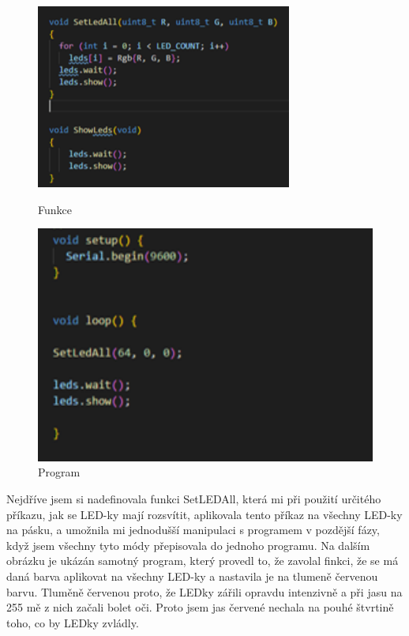     \begin{figure}[htbp]
	\centering
	\begin{minipage}[b]{0.5\textwidth}
		\centering
		\includegraphics[width=0.75\textwidth]{img/015 img/definovane-funkce.png}
		\caption{Funkce}
	\end{minipage}
	\qquad
	\begin{minipage}[b]{0.4\textwidth}
		\centering
		\includegraphics[width=1\textwidth]{img/015 img/Program1-červená.png}
		\caption{Program}
	\end{minipage}
\end{figure}

Nejdříve jsem si nadefinovala funkci SetLEDAll, která mi při použití určitého příkazu, jak se LED-ky mají rozsvítit, aplikovala tento příkaz na všechny LED-ky na pásku, a umožnila mi jednodušší manipulaci s programem v pozdější fázy, když jsem všechny tyto módy přepisovala do jednoho programu. 
Na dalším obrázku je ukázán samotný program, který provedl to, že zavolal finkci, že se má daná barva aplikovat na všechny LED-ky a nastavila je na tlumeně červenou barvu. Tluměně červenou proto, že LEDky zářili opravdu intenzivně a při jasu na 255 mě z nich začali bolet oči. Proto jsem jas červené nechala na pouhé štvrtině toho, co by LEDky zvládly.

